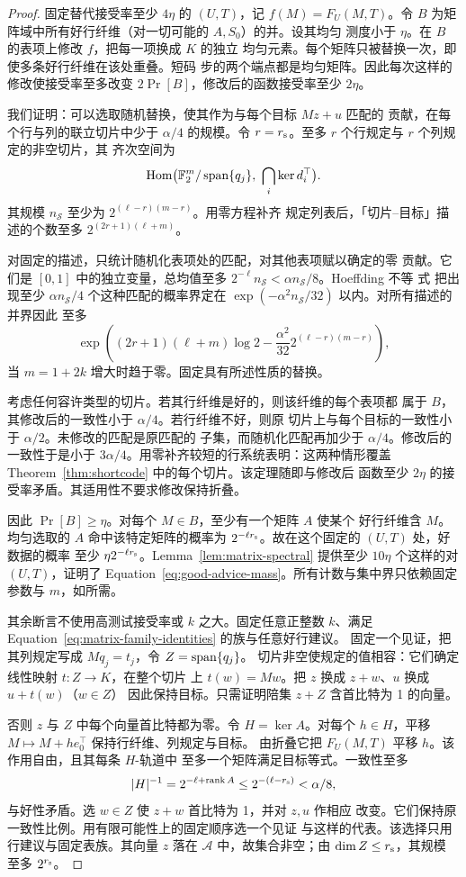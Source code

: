 \begin{proof}
固定替代接受率至少 $4\eta$ 的 $(U,T)$，记 $f(M)=F_U(M,T)$。令
$B$ 为矩阵域中所有好行纤维（对一切可能的 $A,S_0$）的并。设其均匀
测度小于 $\eta$。在 $B$ 的表项上修改 $f$，把每一项换成 $K$ 的独立
均匀元素。每个矩阵只被替换一次，即使多条好行纤维在该处重叠。短码
步的两个端点都是均匀矩阵。因此每次这样的修改使接受率至多改变
$2\Pr[B]$，修改后的函数接受率至少 $2\eta$。

我们证明：可以选取随机替换，使其作为与每个目标 $Mz+u$ 匹配的
贡献，在每个行与列的联立切片中少于 $\alpha/4$ 的规模。令
$r=r_{\rm s}$。至多 $r$ 个行规定与 $r$ 个列规定的非空切片，其
齐次空间为
\[
 \operatorname{Hom}\bigl(\mathbb F_2^m/\operatorname{span}\{q_j\},\ \bigcap_i\ker d_i^\top\bigr).
\]
其规模 $n_{\mathcal S}$ 至少为 $2^{(\ell-r)(m-r)}$。用零方程补齐
规定列表后，「切片–目标」描述的个数至多 $2^{(2r+1)(\ell+m)}$。

对固定的描述，只统计随机化表项处的匹配，对其他表项赋以确定的零
贡献。它们是 $[0,1]$ 中的独立变量，总均值至多
$2^{-\ell}n_{\mathcal S}<\alpha n_{\mathcal S}/8$。Hoeffding 不等
式 \cite[Theorem~2, equation~(2.6)]{Hoeffding1963} 把出现至少
$\alpha n_{\mathcal S}/4$ 个这种匹配的概率界定在
$\exp(-\alpha^2 n_{\mathcal S}/32)$ 以内。对所有描述的并界因此
至多
\[
 \exp\left((2r+1)(\ell+m)\log2
       -\frac{\alpha^2}{32}2^{(\ell-r)(m-r)}\right),
\]
当 $m=1+2k$ 增大时趋于零。固定具有所述性质的替换。

考虑任何容许类型的切片。若其行纤维是好的，则该纤维的每个表项都
属于 $B$，其修改后的一致性小于 $\alpha/4$。若行纤维不好，则原
切片上与每个目标的一致性小于 $\alpha/2$。未修改的匹配是原匹配的
子集，而随机化匹配再加少于 $\alpha/4$。修改后的一致性于是小于
$3\alpha/4$。用零补齐较短的行系统表明：这两种情形覆盖
Theorem~\ref{thm:shortcode} 中的每个切片。该定理随即与修改后
函数至少 $2\eta$ 的接受率矛盾。其适用性不要求修改保持折叠。

因此 $\Pr[B]\ge\eta$。对每个 $M\in B$，至少有一个矩阵 $A$ 使某个
好行纤维含 $M$。均匀选取的 $A$ 命中该特定矩阵的概率为
$2^{-\ell r_{\rm s}}$。故在这个固定的 $(U,T)$ 处，好数据的概率
至少 $\eta2^{-\ell r_{\rm s}}$。Lemma~\ref{lem:matrix-spectral}
提供至少 $10\eta$ 个这样的对 $(U,T)$，证明了
Equation~\eqref{eq:good-advice-mass}。所有计数与集中界只依赖固定
参数与 $m$，如所需。

其余断言不使用高测试接受率或 $k$ 之大。固定任意正整数 $k$、满足
Equation~\eqref{eq:matrix-family-identities} 的族与任意好行建议。
固定一个见证，把其列规定写成 $Mq_j=t_j$，令 $Z=\operatorname{span}\{q_j\}$。
切片非空使规定的值相容：它们确定线性映射 $t:Z\to K$，在整个切片
上 $t(w)=Mw$。把 $z$ 换成 $z+w$、$u$ 换成 $u+t(w)$（$w\in Z$）
因此保持目标。只需证明陪集 $z+Z$ 含首比特为 1 的向量。

否则 $z$ 与 $Z$ 中每个向量首比特都为零。令 $H=\ker A$。对每个
$h\in H$，平移 $M\mapsto M+h e_0^\top$ 保持行纤维、列规定与目标。
由折叠它把 $F_U(M,T)$ 平移 $h$。该作用自由，且其每条 $H$-轨道中
至多一个矩阵满足目标等式。一致性至多
\[
 |H|^{-1}=2^{-\ell+\operatorname{rank} A}
 \le2^{-(\ell-r_{\rm s})}<\alpha/8,
\]
与好性矛盾。选 $w\in Z$ 使 $z+w$ 首比特为 1，并对 $z,u$ 作相应
改变。它们保持原一致性比例。用有限可能性上的固定顺序选一个见证
与这样的代表。该选择只用行建议与固定表族。其向量 $z$ 落在
$\mathcal A$ 中，故集合非空；由 $\dim Z\le r_{\rm s}$，其规模
至多 $2^{r_{\rm s}}$。
\end{proof}

